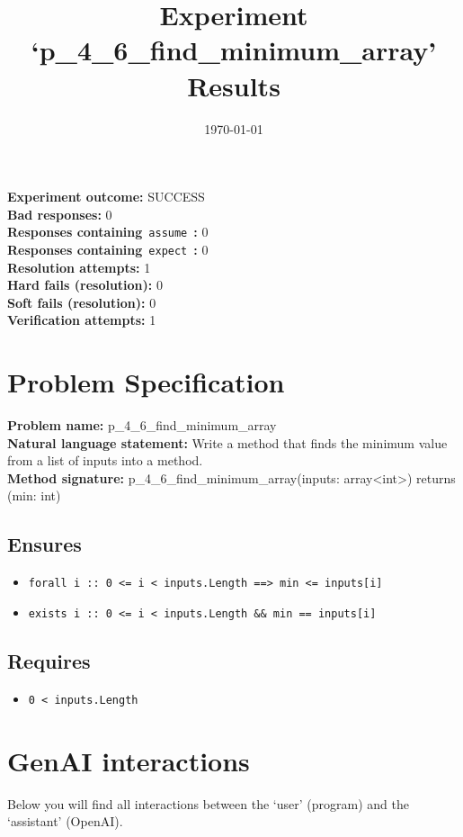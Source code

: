 \documentclass{article}
\begin{document}
\title{Experiment `p\_4\_6\_find\_minimum\_array' Results}
\author{\today}
\date{}
\maketitle
\textbf{Experiment outcome: }SUCCESS
\\\textbf{Bad responses: }0
\\\textbf{Responses containing}~\texttt{assume}~\textbf{: }0
\\\textbf{Responses containing}~\texttt{expect}~\textbf{: }0
\\\textbf{Resolution attempts: }1
\\\textbf{Hard fails (resolution): }0
\\\textbf{Soft fails (resolution): }0
\\\textbf{Verification attempts: }1
\section*{Problem Specification}
\textbf{Problem name: }p\_4\_6\_find\_minimum\_array
\\\textbf{Natural language statement: }Write a method that finds the minimum value from a list of inputs into a method.
\\\textbf{Method signature: }p\_4\_6\_find\_minimum\_array(inputs: array<int>) returns (min: int)
\subsection*{Ensures}
\begin{itemize}
\item \texttt{forall i :: 0 <= i < inputs.Length ==> min <= inputs[i]}
\item \texttt{exists i :: 0 <= i < inputs.Length \&\& min == inputs[i]}
\end{itemize}
\subsection*{Requires}
\begin{itemize}
\item \texttt{0 < inputs.Length}
\end{itemize}
\clearpage
\section*{GenAI interactions}
Below you will find all interactions between the `user' (program) and the `assistant' (OpenAI).
\end{document}
